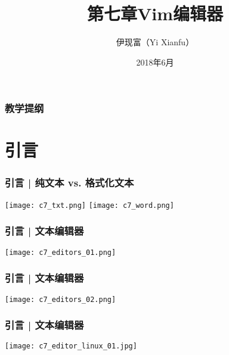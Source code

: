 



\title[Vim]{第七章\quad Vim编辑器}
\author[Yixf]{伊现富（Yi Xianfu）}
\date{2018年6月}


\begin{frame}
  \titlepage
\end{frame}

\begin{frame}[plain,label=current]
  \frametitle{教学提纲}
  \setcounter{tocdepth}{3}
  \begin{multicols}{2}
    \tableofcontents
  \end{multicols}
\end{frame}


\section{引言}
\begin{frame}
  \frametitle{引言 | 纯文本 vs. 格式化文本}
  \begin{center}
    \texttt{[image: c7\_txt.png]}
    \vspace*{0.1cm}
    \texttt{[image: c7\_word.png]}
  \end{center}
\end{frame}

\begin{frame}
  \frametitle{引言 | 文本编辑器}
  \begin{center}
    \texttt{[image: c7\_editors\_01.png]}
  \end{center}
\end{frame}

\begin{frame}
  \frametitle{引言 | 文本编辑器}
  \begin{center}
    \texttt{[image: c7\_editors\_02.png]}
  \end{center}
\end{frame}

\begin{frame}
  \frametitle{引言 | 文本编辑器}
  \begin{center}
    \texttt{[image: c7\_editor\_linux\_01.jpg]}
  \end{center}
\end{frame}

